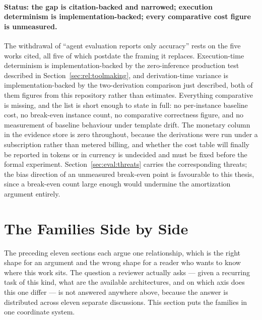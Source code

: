\paragraph{Status: the gap is citation-backed and narrowed; execution determinism is
implementation-backed; every comparative cost figure is unmeasured.}
The withdrawal of ``agent evaluation reports only accuracy'' rests on the five works cited, all
five of which postdate the framing it replaces. Execution-time determinism is
implementation-backed by the zero-inference production test described in
Section~\ref{sec:rel:toolmaking}, and derivation-time variance is implementation-backed by the
two-derivation comparison just described, both of them figures from this repository rather than
estimates. Everything comparative is missing, and the list is short enough to state in full: no
per-instance baseline cost, no break-even instance count, no comparative correctness figure, and
no measurement of baseline behaviour under template drift. The monetary column in the evidence
store is zero throughout, because the derivations were run under a subscription rather than
metered billing, and whether the cost table will finally be reported in tokens or in currency is
undecided and must be fixed before the formal experiment. Section~\ref{sec:eval:threats} carries
the corresponding threats; the bias direction of an unmeasured break-even point is favourable to
this thesis, since a break-even count large enough would undermine the amortization argument
entirely.

\section{The Families Side by Side}
\label{sec:rel:comparison}

%

The preceding eleven sections each argue one relationship, which is the right shape for an
argument and the wrong shape for a reader who wants to know where this work sits. The
question a reviewer actually asks --- given a recurring task of this kind, what are the
available architectures, and on which axis does this one differ --- is not answered anywhere
above, because the answer is distributed across eleven separate discussions. This section
puts the families in one coordinate system.


